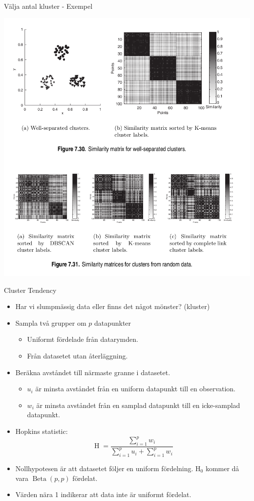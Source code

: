\documentclass[10pt,english]{beamer}
\begin{document}
\begin{frame}{Välja antal kluster - Exempel}

    \includegraphics[width=.7\textwidth]{figs/Similarity matrices for clusters.png}
    
\end{frame}

\begin{frame}{Cluster Tendency}

    \begin{itemize}
        \item Har vi slumpmässig data eller finns det något mönster? (kluster)
        \item Sampla två grupper om $p$ datapunkter
        \begin{itemize}
            \item Uniformt fördelade från datarymden.
            \item Från datasetet utan återläggning.
        \end{itemize}
        \item Beräkna avståndet till närmaste granne i datasetet.
        \begin{itemize}
            \item $u_i$ är minsta avståndet från en uniform datapunkt till en observation.
            \item $w_i$ är minsta avståndet från en samplad datapunkt till en icke-samplad datapunkt.
        \end{itemize}
        \item Hopkins statistic:
        \begin{equation*}
            \operatorname{H}=\frac{\sum_{i=1}^{p}w_i}{\sum_{i=1}^{p}u_i + \sum_{i=1}^{p}w_i}
        \end{equation*}
        \item Nollhypotesen är att datasetet följer en uniform fördelning. $\operatorname{H_0}$ kommer då vara $\operatorname{Beta}(p,p)$ fördelat.
        \item Värden nära 1 indikerar att data inte är uniformt fördelat.
        
    \end{itemize}
    
\end{frame}
\end{document}
